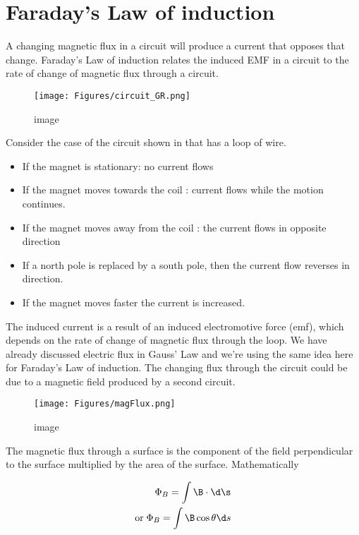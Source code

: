 \documentclass[
]{book}
\theoremstyle{definition}
\theoremstyle{definition}
\theoremstyle{definition}
\theoremstyle{definition}
\theoremstyle{remark}
\begin{document}
\hypertarget{faradays-law-of-induction}{%
\section{Faraday's Law of induction}\label{faradays-law-of-induction}}

A changing magnetic flux in a circuit will produce a current that
opposes that change. Faraday's Law of induction relates the induced EMF
in a circuit to the rate of change of magnetic flux through a circuit.

\begin{figure}
\centering
\texttt{[image: Figures/circuit\_GR.png]}
\caption{image}
\end{figure}

Consider the case of the circuit shown in that has a loop of wire.

\begin{itemize}
\item
  If the magnet is stationary: no current flows
\item
  If the magnet moves towards the coil : current flows while the
  motion continues.
\item
  If the magnet moves away from the coil : the current flows in
  opposite direction
\item
  If a north pole is replaced by a south pole, then the current flow
  reverses in direction.
\item
  If the magnet moves faster the current is increased.
\end{itemize}

The induced current is a result of an induced electromotive force (emf),
which depends on the rate of change of magnetic flux through the loop.
We have already discussed electric flux in Gauss' Law and we're using
the same idea here for Faraday's Law of induction. The changing flux
through the circuit could be due to a magnetic field produced by a
second circuit.

\begin{figure}
\centering
\texttt{[image: Figures/magFlux.png]}
\caption{image}
\end{figure}

The magnetic flux through a surface is the component of the field
perpendicular to the surface multiplied by the area of the surface.
Mathematically

\[\begin{aligned}
\Phi_B = \int\B \cdot \d\s \\  
\text{or} \; \Phi_B = \int \B \cos\theta \d s
\end{aligned}\]
\end{document}
